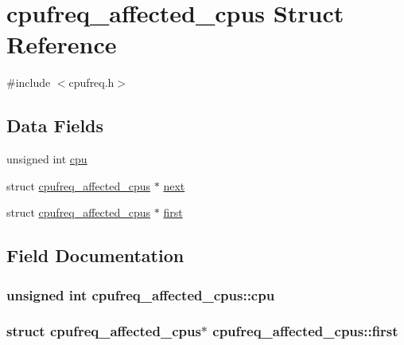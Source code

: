 \hypertarget{structcpufreq__affected__cpus}{}\section{cpufreq\+\_\+affected\+\_\+cpus Struct Reference}
\label{structcpufreq__affected__cpus}


{\ttfamily \#include $<$cpufreq.\+h$>$}

\subsection*{Data Fields}
\begin{DoxyCompactItemize}
\item 
unsigned int \hyperlink{structcpufreq__affected__cpus_af96a15662dd080fb87696aef5d09ac1c}{cpu}
\item 
struct \hyperlink{structcpufreq__affected__cpus}{cpufreq\+\_\+affected\+\_\+cpus} $\ast$ \hyperlink{structcpufreq__affected__cpus_ad811e7d6fb5d9f7e2c13558c3ba7d07f}{next}
\item 
struct \hyperlink{structcpufreq__affected__cpus}{cpufreq\+\_\+affected\+\_\+cpus} $\ast$ \hyperlink{structcpufreq__affected__cpus_afa0443d824bd14ff01e64b3b72a99a09}{first}
\end{DoxyCompactItemize}


\subsection{Field Documentation}
\subsubsection[{\texorpdfstring{cpu}{cpu}}]{\setlength{\rightskip}{0pt plus 5cm}unsigned int cpufreq\+\_\+affected\+\_\+cpus\+::cpu}\hypertarget{structcpufreq__affected__cpus_af96a15662dd080fb87696aef5d09ac1c}{}\label{structcpufreq__affected__cpus_af96a15662dd080fb87696aef5d09ac1c}
\subsubsection[{\texorpdfstring{first}{first}}]{\setlength{\rightskip}{0pt plus 5cm}struct {\bf cpufreq\+\_\+affected\+\_\+cpus}$\ast$ cpufreq\+\_\+affected\+\_\+cpus\+::first}\hypertarget{structcpufreq__affected__cpus_afa0443d824bd14ff01e64b3b72a99a09}{}\label{structcpufreq__affected__cpus_afa0443d824bd14ff01e64b3b72a99a09}
